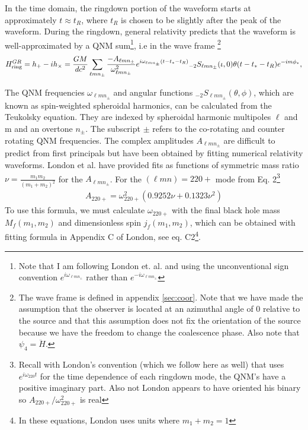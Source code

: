 \documentclass[aps,prd,amsmath,showpacs,amssymb,superscriptaddress,nofootinbib,longbibliography,eqsecnum,preprintnumbers]{revtex4-1}
\newcommand{\Sph}{{}_{-2}S_{\ell m n_{\pm}}}
\newcommand{\mul}{{\ell m n_{\pm}}}
\begin{document}
In the time domain, the ringdown portion of the waveform starts at approximately $t\approx t_R$, where $t_R$ is chosen to be slightly after the peak of the waveform. During the ringdown, general relativity predicts that the waveform is well-approximated by a QNM sum\footnote{Note that I am following London et. al. and using the unconventional sign convention $e^{i\omega_\mul}$ rather than $e^{-i\omega_\mul}$}, i.e in the wave frame \footnote{The wave frame is defined in appendix \ref{sec:coor}. Note that we have made the assumption that the observer is located at an azimuthal angle of 0 relative to the source and that this assumption does not fix the orientation of the source because we have the freedom to change the coalescence phase. Also note that $\psi_4= \ddot H$.}
\begin{align}
H_{\rm ring}^{GR}=h_+-ih_\times=\frac{GM}{dc^2}\sum_{\ell m n_{\pm}}\frac{-A_{\ell m n_{\pm}}}{\omega_\mul^2}e^{i\omega_{\ell m n_{\pm}}(t-t_*-t_R)}\Sph(\iota,0)\theta(t-t_*-t_R)e^{-im\phi_*},
\end{align}

The QNM frequencies $\omega_\mul$ and angular functions $\Sph(\theta, \phi)$, which are known as spin-weighted spheroidal harmonics, can be calculated from the Teukolsky equation. They are indexed by spheroidal harmonic multipoles $\ell$ and m and an overtone $n_\pm$. The subscript $\pm$ refers to the co-rotating and counter rotating QNM frequencies. The complex amplitudes $A_\mul$ are difficult to predict from first principals but have been obtained by fitting numerical relativity waveforms. London et al. \cite{London:2014cma} have provided fits as functions of symmetric mass ratio $\nu=\frac{m_1m_2}{(m_1+m_2)^2}$ for the $A_{\ell m n_\pm}$. For the $(\ell m n) =220+$ mode from Eq. 2\footnote{Recall with London's convention (which we follow here as well) that uses $e^{i\omega_{220}t}$ for the time dependence of each ringdown mode, the QNM's have a positive imaginary part. Also not London appears to have oriented his binary so $A_{220+}/\omega_{220+}^2$ is real}
\begin{align}
A_{220+}=\omega_{220+}^2\left(0.9252 \nu +0.1323\nu^2 \right)
\label{eq:A220}
\end{align}
To use this formula, we must calculate $\omega_{220+}$ with the final black hole mass $M_f(m_1,m_2)$ and dimensionless spin $j_f(m_1,m_2)$, which can be obtained with fitting formula in Appendix C of London, see eq. C2\footnote{In these equations, London uses units where $m_1+m_2 =1$}.
\end{document}
